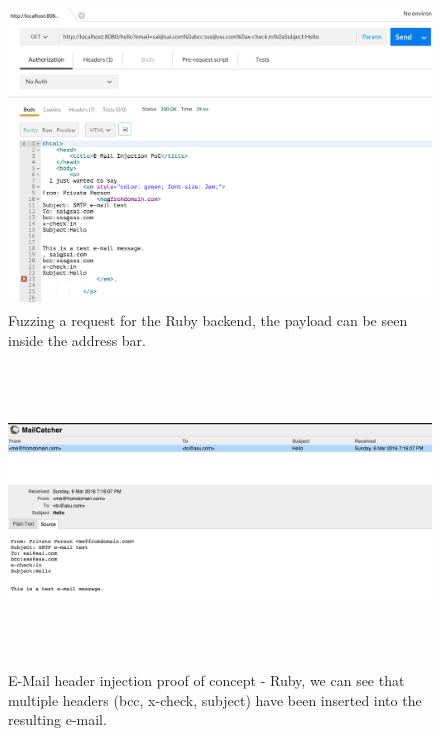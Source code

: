 \begin{figure}[!htbp]
	\centering
	\includegraphics[width=14cm, height=8cm]{System/EMI_Postman_Ruby}
	\caption[]{Fuzzing a request for the Ruby backend, the payload can be seen inside the address bar.}
	\label{fig:postmanruby}
\end{figure}

\begin{figure}[!htbp]
	\centering
	\includegraphics[width=14cm, height=8cm]{System/EMI_Mailcatcher_Ruby}
	\caption[]{E-Mail header injection proof of concept - Ruby, we can see that multiple headers (bcc, x-check, subject) have been inserted into the resulting e-mail.}
	\label{fig:mailcatcherruby}
\end{figure}